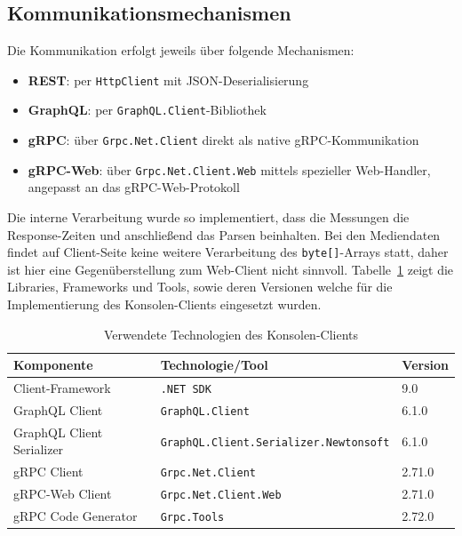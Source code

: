 \begin{enumerate}
	\subsection*{Kommunikationsmechanismen}
	Die Kommunikation erfolgt jeweils über folgende Mechanismen:
	\begin{itemize}
		\item \textbf{REST}: per \texttt{HttpClient} mit JSON-Deserialisierung
		\item \textbf{GraphQL}: per \texttt{GraphQL.Client}-Bibliothek
		\item \textbf{gRPC}: über \texttt{Grpc.Net.Client} direkt als native gRPC-Kommunikation
		\item \textbf{gRPC-Web}: über \texttt{Grpc.Net.Client.Web} mittels spezieller Web-Handler, angepasst an das gRPC-Web-Protokoll
	\end{itemize}
	
	Die interne Verarbeitung wurde so implementiert, dass die Messungen die Response-Zeiten und anschließend das Parsen beinhalten.  
	Bei den Mediendaten findet auf Client-Seite keine weitere Verarbeitung des \texttt{byte[]}-Arrays statt, daher ist hier eine Gegenüberstellung zum Web-Client nicht sinnvoll.
	Tabelle~\ref{tab:console-tech} zeigt die Libraries, Frameworks und Tools, sowie deren Versionen welche für die Implementierung des Konsolen-Clients eingesetzt wurden.
	
	\begin{table}[h]
		\centering
		\caption{Verwendete Technologien des Konsolen-Clients}
		\label{tab:console-tech}
		\begin{tabular}{lll}
			\hline
			\textbf{Komponente} & \textbf{Technologie/Tool} & \textbf{Version} \\
			\hline
			Client-Framework & \texttt{.NET~SDK} & 9.0 \\
			GraphQL Client & \texttt{GraphQL.Client} & 6.1.0 \\
			GraphQL Client Serializer & \texttt{GraphQL.Client.Serializer.Newtonsoft} & 6.1.0 \\
			gRPC Client & \texttt{Grpc.Net.Client} & 2.71.0 \\
			gRPC-Web Client & \texttt{Grpc.Net.Client.Web} & 2.71.0 \\
			gRPC Code Generator & \texttt{Grpc.Tools} & 2.72.0 \\
			\hline
		\end{tabular}
	\end{table}
	
\end{enumerate}
